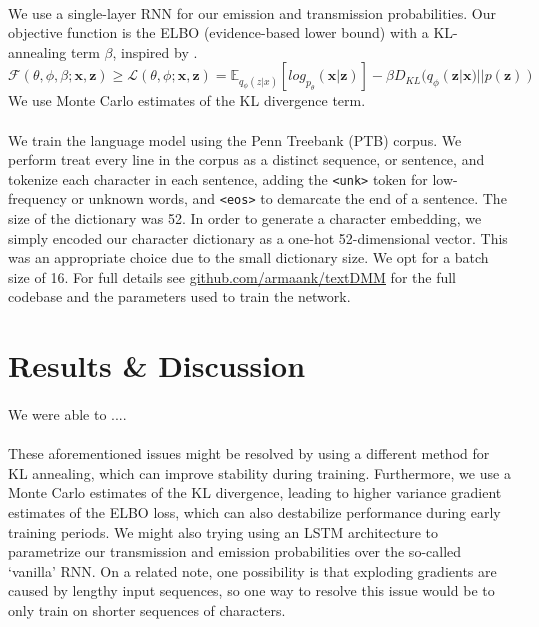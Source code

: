 \documentclass[justified,nobib]{tufte-handout}
\begin{document}
\begin{fullwidth}
\paragraph{}
 We use a single-layer RNN for our emission and transmission probabilities. Our objective function is the ELBO (evidence-based lower bound) with a KL-annealing term $\beta$, inspired by \cite{bvae}.
 \begin{equation}
\mathcal{F}(\theta,\phi,\beta;\bm{x},\bm{z}) \geq \mathcal{L}(\theta,\phi;\bm{x},\bm{z}) = \mathbb{E}_{q_{\phi}(z|x)}[log_{p_{\theta}}(\bm{x}|\bm{z})]-\beta D_{KL}(q_{\phi}(\bm{z}|\bm{x})||p(\bm{z}))
\end{equation} 
We use Monte Carlo estimates of the KL divergence term. 
\paragraph{} We train the language model using the Penn Treebank (PTB) corpus. We perform treat every line in the corpus as a distinct sequence, or sentence, and tokenize each character in each sentence, adding the \texttt{<unk>} token for low-frequency or unknown words, and \texttt{<eos>} to demarcate the end of a sentence. The size of the dictionary was 52. In order to generate a character embedding, we simply encoded our character dictionary as a one-hot 52-dimensional vector. This was an appropriate choice due to the small dictionary size. We opt for a batch size of 16. For full details see \underline{\href{https://github.com/armaank/textDMM}{github.com/armaank/textDMM}} for the full codebase and the parameters used to train the network. 

\section{Results \& Discussion}

\paragraph{} We were able to ....

\paragraph{} These aforementioned issues might be resolved by using a different method for KL annealing, which can improve stability during training. Furthermore, we use a Monte Carlo estimates of the KL divergence, leading to higher variance gradient estimates of the ELBO loss, which can also destabilize performance during early training periods. We might also trying using an LSTM architecture to parametrize our transmission and emission probabilities over the so-called `vanilla' RNN. On a related note, one possibility is that exploding gradients are caused by lengthy input sequences, so one way to resolve this issue would be to only train on shorter sequences of characters. 


\end{fullwidth}
\end{document}
